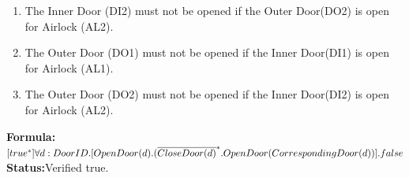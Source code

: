 \documentclass[a4paper,12pt]{article}
\begin{document}
\begin{enumerate}
\begin{enumerate}
			\item The Inner Door (DI2) must not be opened if the Outer Door(DO2) is open for Airlock (AL2).
			
			\item The Outer Door (DO1) must not be opened if the Inner Door(DI1) is open for Airlock (AL1).
			
			\item The Outer Door (DO2) must not be opened if the Inner Door(DI2) is open for Airlock (AL2).
		\end{enumerate}
		
		\textbf{Formula:} $[true^*] \forall d: DoorID.[OpenDoor(d).
		\\(\overline{CloseDoor(d)}^*.OpenDoor(CorrespondingDoor(d))].false$ \\\textbf{Status:}Verified true.
		

\end{enumerate}
\end{document}
